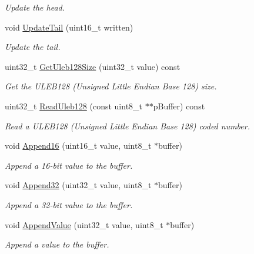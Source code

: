 \begin{DoxyCompactItemize}
\begin{DoxyCompactList}\small\item\em Update the head. \end{DoxyCompactList}\item 
void \hyperlink{classns3_1_1PacketMetadata_ad975bb9c1c0a6875ccc2309f071c5b55}{Update\+Tail} (uint16\+\_\+t written)
\begin{DoxyCompactList}\small\item\em Update the tail. \end{DoxyCompactList}\item 
uint32\+\_\+t \hyperlink{classns3_1_1PacketMetadata_a4ea634655d1780a2b4dd9a3ac54c3501}{Get\+Uleb128\+Size} (uint32\+\_\+t value) const 
\begin{DoxyCompactList}\small\item\em Get the U\+L\+E\+B128 (Unsigned Little Endian Base 128) size. \end{DoxyCompactList}\item 
uint32\+\_\+t \hyperlink{classns3_1_1PacketMetadata_a7ae75db766a843dbee8960ae8cbf23ee}{Read\+Uleb128} (const uint8\+\_\+t $\ast$$\ast$p\+Buffer) const 
\begin{DoxyCompactList}\small\item\em Read a U\+L\+E\+B128 (Unsigned Little Endian Base 128) coded number. \end{DoxyCompactList}\item 
void \hyperlink{classns3_1_1PacketMetadata_ab80adc9c544b0f087715acf15e255707}{Append16} (uint16\+\_\+t value, uint8\+\_\+t $\ast$buffer)
\begin{DoxyCompactList}\small\item\em Append a 16-\/bit value to the buffer. \end{DoxyCompactList}\item 
void \hyperlink{classns3_1_1PacketMetadata_a254b3766510c9b38a2ad0bec6d973f15}{Append32} (uint32\+\_\+t value, uint8\+\_\+t $\ast$buffer)
\begin{DoxyCompactList}\small\item\em Append a 32-\/bit value to the buffer. \end{DoxyCompactList}\item 
void \hyperlink{classns3_1_1PacketMetadata_a48151488856a00fc7325c3e761b19b97}{Append\+Value} (uint32\+\_\+t value, uint8\+\_\+t $\ast$buffer)
\begin{DoxyCompactList}\small\item\em Append a value to the buffer. \end{DoxyCompactList}\item 
$$
\end{DoxyCompactItemize}
